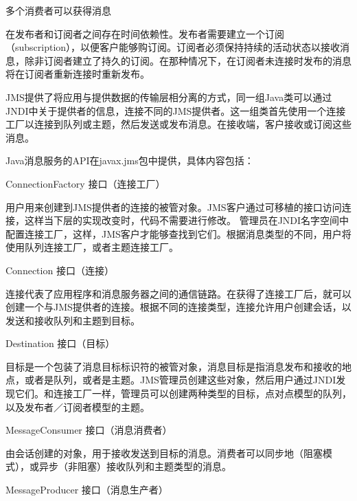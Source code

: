 \begin{compactitem}
\item 多个消费者可以获得消息
\item 在发布者和订阅者之间存在时间依赖性。发布者需要建立一个订阅（subscription），以便客户能够购订阅。订阅者必须保持持续的活动状态以接收消息，除非订阅者建立了持久的订阅。在那种情况下，在订阅者未连接时发布的消息将在订阅者重新连接时重新发布。
\end{compactitem}

JMS提供了将应用与提供数据的传输层相分离的方式，同一组Java类可以通过JNDI中关于提供者的信息，连接不同的JMS提供者。这一组类首先使用一个连接工厂以连接到队列或主题，然后发送或发布消息。在接收端，客户接收或订阅这些消息。

Java消息服务的API在javax.jms包中提供，具体内容包括：

\begin{compactitem}
\item ConnectionFactory 接口（连接工厂）

用户用来创建到JMS提供者的连接的被管对象。JMS客户通过可移植的接口访问连接，这样当下层的实现改变时，代码不需要进行修改。 管理员在JNDI名字空间中配置连接工厂，这样，JMS客户才能够查找到它们。根据消息类型的不同，用户将使用队列连接工厂，或者主题连接工厂。



\item Connection 接口（连接）

连接代表了应用程序和消息服务器之间的通信链路。在获得了连接工厂后，就可以创建一个与JMS提供者的连接。根据不同的连接类型，连接允许用户创建会话，以发送和接收队列和主题到目标。



\item Destination 接口（目标）

目标是一个包装了消息目标标识符的被管对象，消息目标是指消息发布和接收的地点，或者是队列，或者是主题。JMS管理员创建这些对象，然后用户通过JNDI发现它们。和连接工厂一样，管理员可以创建两种类型的目标，点对点模型的队列，以及发布者／订阅者模型的主题。



\item MessageConsumer 接口（消息消费者）

由会话创建的对象，用于接收发送到目标的消息。消费者可以同步地（阻塞模式），或异步（非阻塞）接收队列和主题类型的消息。



\item MessageProducer 接口（消息生产者）


\end{compactitem}
